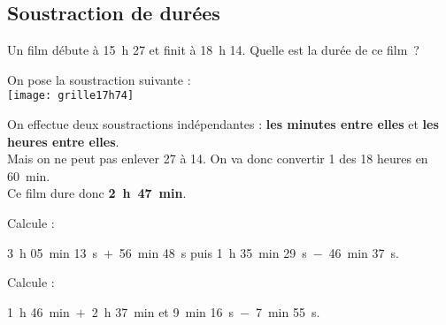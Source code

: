 \begin{methode*1}
\begin{exemple*1}
\end{exemple*1}


\subsection{Soustraction de durées}

\begin{exemple*1}
Un film débute à 15 h 27 et finit à 18 h 14. Quelle est la durée de ce film ? \\[1em]

\begin{minipage}[t]{.34\textwidth}
On pose la soustraction suivante :\\[0.2em]

\texttt{[image: grille17h74]}
\end{minipage}\hfill%
\begin{minipage}[t]{.60\textwidth}
On effectue deux soustractions indépendantes : 
\textcolor{vert}{\textbf{les minutes entre elles}} et \textcolor{bleu}{\textbf{les heures entre elles}}.\\[0.75em]
Mais on ne peut pas enlever 27 à 14. 
On va donc convertir 1 des 18 heures en 60 min. \\[0.75em]
Ce film dure donc \textcolor{rose}{\textbf{2 h 47 min}}.
\end{minipage}

\end{exemple*1}

\exercice
Calcule :

3 h 05 min 13 s $+$ 56 min 48 s puis 1 h 35 min 29 s $-$ 46 min 37 s.

\exercice
Calcule :

1 h 46 min $+$ 2 h 37 min et 9 min 16 s $-$ 7 min 55 s.

\end{methode*1}